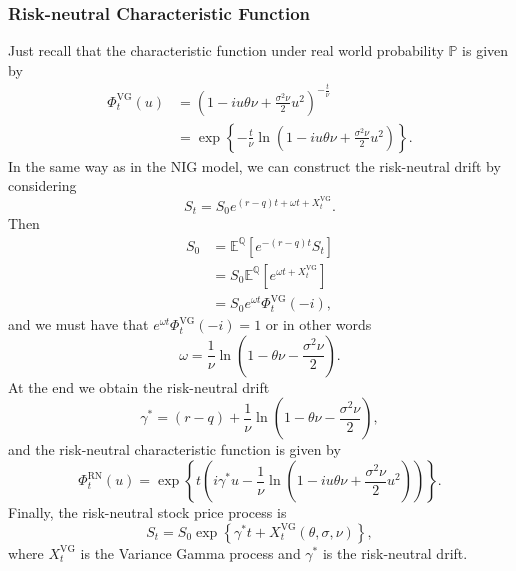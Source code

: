 \subsubsection*{Risk-neutral Characteristic Function}
Just recall that the characteristic function under real world probability $\mathbb{P}$ is given by
\begin{align*}
\Phi_t^\text{VG}(u)&=\left(1-iu\theta\nu+\frac{\sigma^2\nu}{2}u^2\right)^{-\frac{t}{\nu}}\\
&=\exp\left\{-\frac{t}{\nu}\ln\left(1-iu\theta\nu+\frac{\sigma^2\nu}{2}u^2\right)\right\}.
\end{align*}
In the same way as in the NIG model, we can construct the risk-neutral drift by considering
$$S_t=S_0 e^{(r-q)t+\omega t +X_t^\text{VG}}.$$
Then
\begin{align*}
S_0&=\mathbb{E}^\mathbb{Q}\left[e^{-(r-q)t}S_t\right]\\
&=S_0\mathbb{E}^\mathbb{Q}\left[e^{\omega t + X^\text{VG}_t}\right]\\
&=S_0e^{\omega t}\Phi_t^\text{VG}(-i),
\end{align*}
and we must have that $e^{\omega t}\Phi^\text{VG}_t(-i) = 1$ or in other words
$$\omega = \frac{1}{\nu}\ln\left(1-\theta\nu-\frac{\sigma^2\nu}{2}\right).$$
At the end we obtain the risk-neutral drift
$$\gamma^\ast = (r-q) + \frac{1}{\nu}\ln\left(1-\theta\nu-\frac{\sigma^2\nu}{2}\right),$$
and the risk-neutral characteristic function is given by
$$\Phi_t^\text{RN}(u)=\exp\left\{t\left(i\gamma^\ast u-\frac{1}{\nu}\ln\left(1-iu\theta\nu+\frac{\sigma^2\nu}{2}u^2\right)\right)\right\}.$$
Finally, the risk-neutral stock price process is 
$$S_t = S_0\exp\left\{\gamma^\ast t+X_t^\text{VG}(\theta,\sigma,\nu)\right\},$$
where $X_t^\text{VG}$ is the Variance Gamma process and $\gamma^\ast$ is the risk-neutral drift.

